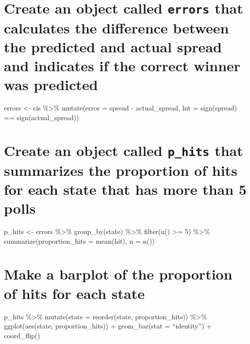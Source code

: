 \documentclass[
]{article}
\begin{document}
\hypertarget{create-an-object-called-errors-that-calculates-the-difference-between-the-predicted-and-actual-spread-and-indicates-if-the-correct-winner-was-predicted-1}{%
\section{\texorpdfstring{Create an object called \texttt{errors} that
calculates the difference between the predicted and actual spread and
indicates if the correct winner was
predicted}{Create an object called errors that calculates the difference between the predicted and actual spread and indicates if the correct winner was predicted}}\label{create-an-object-called-errors-that-calculates-the-difference-between-the-predicted-and-actual-spread-and-indicates-if-the-correct-winner-was-predicted-1}}

errors \textless- cis \%\textgreater\% mutate(error = spread -
actual\_spread, hit = sign(spread) == sign(actual\_spread))

\hypertarget{create-an-object-called-p_hits-that-summarizes-the-proportion-of-hits-for-each-state-that-has-more-than-5-polls}{%
\section{\texorpdfstring{Create an object called \texttt{p\_hits} that
summarizes the proportion of hits for each state that has more than 5
polls}{Create an object called p\_hits that summarizes the proportion of hits for each state that has more than 5 polls}}\label{create-an-object-called-p_hits-that-summarizes-the-proportion-of-hits-for-each-state-that-has-more-than-5-polls}}

p\_hits \textless- errors \%\textgreater\% group\_by(state)
\%\textgreater\% filter(n() \textgreater= 5) \%\textgreater\%
summarize(proportion\_hits = mean(hit), n = n())

\hypertarget{make-a-barplot-of-the-proportion-of-hits-for-each-state}{%
\section{Make a barplot of the proportion of hits for each
state}\label{make-a-barplot-of-the-proportion-of-hits-for-each-state}}

p\_hits \%\textgreater\% mutate(state = reorder(state,
proportion\_hits)) \%\textgreater\% ggplot(aes(state, proportion\_hits))
+ geom\_bar(stat = ``identity'') + coord\_flip()
\end{document}
